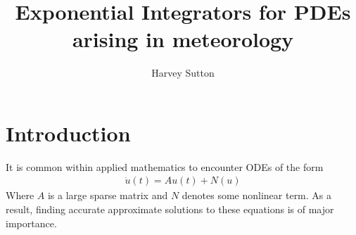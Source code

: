 \documentclass{article}
\begin{document}
\title{Exponential Integrators for PDEs arising in meteorology} 
\maketitle
\author{Harvey Sutton}

\tableofcontents
\newpage

\section {Introduction}
It is common within applied mathematics to encounter ODEs of the form
\begin{align}
\dot u(t) = Au(t) + N(u) \label{ODE}
\end{align}
Where $A$ is a large sparse matrix and $N$ denotes some nonlinear term.
As a result, finding accurate approximate solutions to these equations is of major importance.\\
\end{document}

